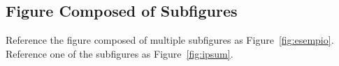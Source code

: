 \documentclass[
10pt, %
a4paper, %
oneside, %
headinclude,footinclude, %
BCOR5mm, %
]{scrartcl}
\begin{document}

\subsection{Figure Composed of Subfigures}

Reference the figure composed of multiple subfigures as Figure~\vref{fig:esempio}. Reference one of the subfigures as Figure~\vref{fig:ipsum}. %



\renewcommand{\refname}{\spacedlowsmallcaps{References}} %














\end{document}

